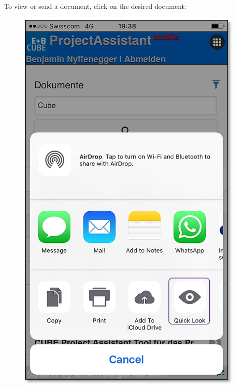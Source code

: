 
\pagebreak

To view or send a document, click on the desired document:

\vspace{\baselineskip}

\begin{figure}   %
  \vspace{-35pt}      %
  \begin{center}
    \includegraphics[width=1\linewidth]{../chapters/11_Dokumentenablage/pictures/11-mob06_Dokumente_anschauen.jpg}
  \end{center}
  \vspace{-20pt}
  \vspace{-10pt}
\end{figure}

